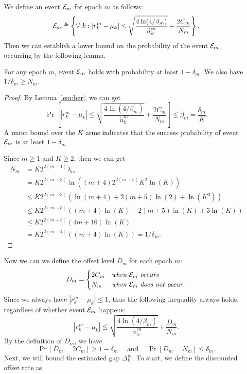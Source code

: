We define an event ${\mathcal{E}}_m$ for epoch $m$ as follows:
\begin{equation*}
    {\mathcal{E}}_m \triangleq \left\{ \forall\ k: |r_k^m - \mu_k| \leq \sqrt{\frac{4\ln(4 /\beta_m)}{\widetilde{n}_k^m}} + \frac{2C_m}{N_m} \right\}.
\end{equation*}
Then we can establish a lower bound on the probability of the event ${\mathcal{E}}_m$ occurring by the following lemma.
\begin{lemma}
\label{lem:pem} %
     For any epoch $m$, event ${\mathcal{E}}_m$ holds with probability at least $1 - \delta_m$. We also have $1 / \delta_m \geq N_m$.
\end{lemma}
\begin{proof}
    By Lemma \ref{lem:ber}, we can get
    \[\Pr\left[|r_k^m - \mu_k| \leq \sqrt{\frac{4\ln(4 /\beta_m)}{\widetilde{n}_k^m}} + \frac{2C_m}{N_m}\right] \leq \beta_m = \frac{\delta_m}{K}.\]
    A union bound over the $K$ arms indicates that the success probability of event ${\mathcal{E}}_m$ is at least $1 - \delta_m$.

    Since $m \geq 1$ and $K \geq 2$, then we can get
    \begin{align*}
        N_m &= K 2^{2(m-1)} \lambda_m \\
        &= K 2^{2(m+3)}\ln((m+4) 2^{2(m+5)} K^2 \ln(K))  \\
        &\leq  K 2^{2(m+3)}(\ln(m+4)+2(m+5)\ln(2)+ \ln(K^3))  \\
        &\leq K 2^{2(m+3)}((m+4)\ln(K)+ 2(m+5)\ln(K) + 3\ln (K)) \\
        &\leq K 2^{2(m+3)}(4m+16)\ln(K) \\
        &= K 2^{2(m+4)} ((m + 4)\ln (K)) = 1 / \delta_m.
    \end{align*}
\end{proof}
Now we can we define the offset level $D_m$ for each epoch $m$:
\[D_m = \begin{cases}
    2C_m & \textit{when ${\mathcal{E}}_m$ occurs} \\
    N_m & \textit{when ${\mathcal{E}}_m$ does not occur}
\end{cases}.\]
Since we always have $|r_k^m - \mu_k| \leq 1$, thus the following inequality always holds, regardless of whether event ${\mathcal{E}}_m$ happens:
\[|r_k^m - \mu_k| \leq \sqrt{\frac{4\ln(4 /\beta_m)}{\widetilde{n}_k^m}} + \frac{D_m}{N_m}.\]
By the definition of $D_m$, we have 
\[\Pr[D_m = 2C_m] \geq 1 - \delta_m \quad \text{ and } \quad \Pr[D_m = N_m] \leq \delta_m.\]
Next, we will bound the estimated gap $\Delta_k^m$. To start, we define the discounted offset rate as
